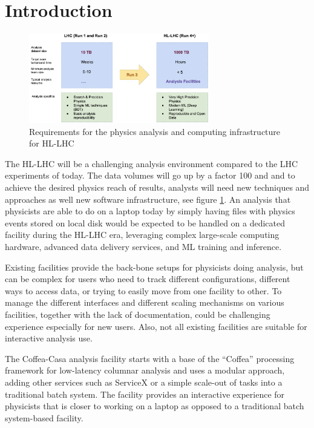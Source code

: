 \documentclass{webofc}
\begin{document}
\section{Introduction}
\label{intro}
 
\begin{figure}
\centering
\sidecaption
\includegraphics[width=0.7\textwidth]{hl-lhc.png}
\caption{Requirements for the physics analysis and computing infrastructure for HL-LHC}
\label{fig-1}       %
\end{figure}

The HL-LHC will be a challenging analysis environment compared to the LHC experiments of today. The data volumes will go up by a factor 100 and and to achieve the desired physics reach of results, analysts will need new techniques and approaches as well new software infrastructure, see figure \ref{fig-1}. An analysis that physicists are able to do on a laptop today by simply having files with physics events stored on local disk would  be expected to be handled on a dedicated facility during the HL-LHC era, leveraging complex large-scale computing hardware, advanced data delivery services, and ML training and inference. 

Existing facilities  provide the back-bone setups for physicists doing analysis, but can be complex for users who need to track different configurations, different ways to access data, or trying to easily move from one facility to other. To manage the different interfaces and different scaling mechanisms on various facilities, together with the lack of documentation, could be challenging experience especially for new users. Also, not all existing facilities are suitable for interactive analysis use. 

The Coffea-Casa analysis facility \cite{adamec2021coffea} starts with a base of the “Coffea” processing framework \cite{smith_nick_2020} for low-latency columnar analysis and uses a modular approach, adding other services such as ServiceX \cite{servicex} or a simple scale-out of tasks into a traditional batch system. The facility provides an interactive experience for physicists that is closer to working on a laptop as opposed to a traditional batch system-based facility. 
\end{document}
